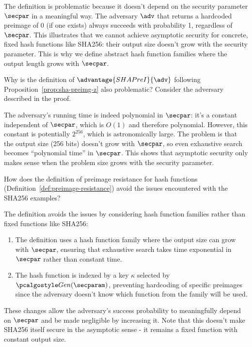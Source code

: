 \ifsolutions
\begin{mysolution}
  The definition is problematic because it doesn't depend on the security parameter $\secpar$ in a meaningful way.
  The adversary $\adv$ that returns a hardcoded preimage of 0 (if one exists) always succeeds with probability 1, regardless of $\secpar$.
  This illustrates that we cannot achieve asymptotic security for concrete, fixed hash functions like SHA256: their output size doesn't grow with the security parameter.
  This is why we define abstract hash function families where the output length grows with $\secpar$.
\end{mysolution}
\fi

\begin{exercise}\label{ex:sha-random-preimage-problem}
  Why is the definition of $\advantage{SHAPreI}{\adv}$ following Proposition~\ref{prop:sha-preimg-z} also problematic?
  Consider the adversary described in the proof.
\end{exercise}

\ifsolutions
\begin{mysolution}
  The adversary's running time is indeed polynomial in $\secpar$: it's a constant independent of $\secpar$, which is $O(1)$ and therefore polynomial.
  However, this constant is potentially $2^{256}$, which is astronomically large.
  The problem is that the output size (256 bits) doesn't grow with $\secpar$, so even exhaustive search becomes ``polynomial time'' in $\secpar$.
  This shows that asymptotic security only makes sense when the problem size grows with the security parameter.
\end{mysolution}
\fi

\begin{exercise}\label{ex:hash-function-definition}
  How does the definition of preimage resistance for hash functions (Definition~\ref{def:preimage-resistance}) avoid the issues encountered with the SHA256 examples?
\end{exercise}

\ifsolutions
\begin{mysolution}
  The definition avoids the issues by considering hash function families rather than fixed functions like SHA256:
  \begin{enumerate}
    \item The definition uses a hash function family where the output size can grow with $\secpar$, ensuring that exhaustive search takes time exponential in $\secpar$ rather than constant time.
    \item The hash function is indexed by a key $\kappa$ selected by $\algo{Gen}(\secparam)$, preventing hardcoding of specific preimages since the adversary doesn't know which function from the family will be used.
  \end{enumerate}
  These changes allow the adversary's success probability to meaningfully depend on $\secpar$ and be made negligible by increasing it.
  Note that this doesn't make SHA256 itself secure in the asymptotic sense - it remains a fixed function with constant output size.
\end{mysolution}
\fi

